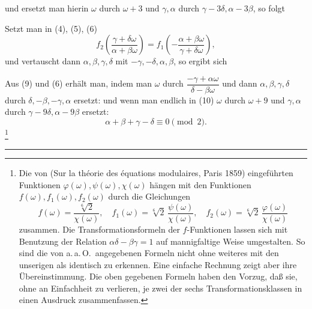 und ersetzt man hierin $\omega$ durch $\omega+3$ und $\gamma, \alpha$ durch $\gamma-3\delta, \alpha-3\beta$, so folgt

Setzt man in (4), (5), (6)
\[
f_2\!\left(\frac{\gamma+\delta\omega}{\alpha+\beta\omega}\right) = f_1\!\left(-\frac{\alpha+\beta\omega}{\gamma+\delta\omega}\right),
\]
und vertauscht dann $\alpha, \beta, \gamma, \delta$ mit $-\gamma, -\delta, \alpha, \beta$, so ergibt sich

Aus (9) und (6) erhält man, indem man $\omega$ durch $\dfrac{-\gamma+\alpha\omega}{\delta-\beta\omega}$ und dann $\alpha, \beta, \gamma, \delta$ durch $\delta, -\beta, -\gamma, \alpha$ ersetzt:
und wenn man endlich in (10) $\omega$ durch $\omega+9$ und $\gamma, \alpha$ durch $\gamma-9\delta, \alpha-9\beta$ ersetzt:
\[
\alpha+\beta+\gamma-\delta \equiv 0 \pmod{2}.
\]
\footnote{Die von  (Sur la théorie des équations modulaires, Paris 1859) eingeführten Funktionen $\varphi(\omega), \psi(\omega), \chi(\omega)$ hängen mit den Funktionen $f(\omega), f_1(\omega), f_2(\omega)$ durch die Gleichungen
\[
f(\omega) = \frac{\sqrt[6]{2}}{\chi(\omega)}, \quad f_1(\omega) = \sqrt[6]{2}\,\frac{\psi(\omega)}{\chi(\omega)}, \quad f_2(\omega) = \sqrt[6]{2}\,\frac{\varphi(\omega)}{\chi(\omega)}
\]
zusammen. Die Transformationsformeln der $f$-Funktionen lassen sich mit Benutzung der Relation $\alpha\delta-\beta\gamma=1$ auf mannigfaltige Weise umgestalten. So sind die von  a.\,a.\,O.\ angegebenen Formeln nicht ohne weiteres mit den unserigen als identisch zu erkennen. Eine einfache Rechnung zeigt aber ihre Übereinstimmung. Die oben gegebenen Formeln haben den Vorzug, daß sie, ohne an Einfachheit zu verlieren, je zwei der sechs Transformationsklassen in einen Ausdruck zusammenfassen.}

\begin{center}\rule{2cm}{0.4pt}\end{center}
